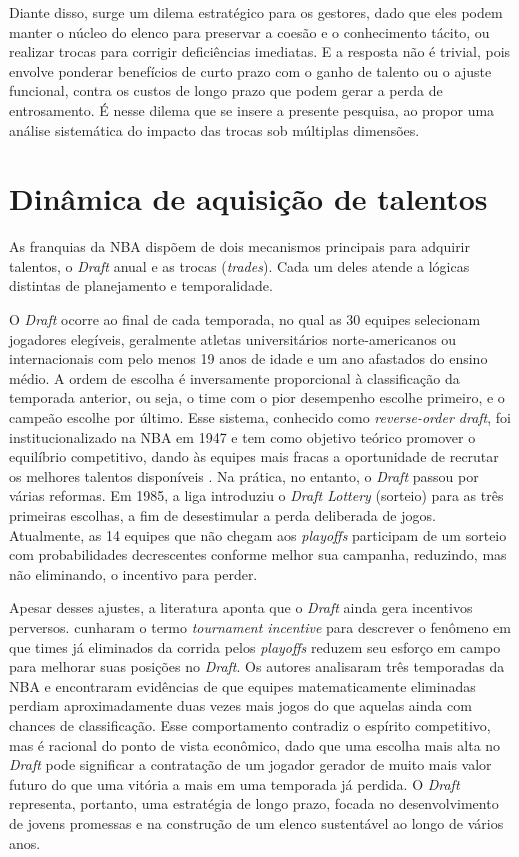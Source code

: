 Diante disso, surge um dilema estratégico para os gestores, dado que eles podem manter o núcleo do elenco para preservar a coesão e o conhecimento tácito, ou realizar trocas para corrigir deficiências imediatas. E a resposta não é trivial, pois envolve ponderar benefícios de curto prazo com o ganho de talento ou o ajuste funcional, contra os custos de longo prazo que podem gerar a perda de entrosamento. É nesse dilema que se insere a presente pesquisa, ao propor uma análise sistemática do impacto das trocas sob múltiplas dimensões.

\section{Dinâmica de aquisição de talentos}
\label{sec:talent_acquisition}

As franquias da NBA dispõem de dois mecanismos principais para adquirir talentos, o \textit{Draft} anual e as trocas (\textit{trades}). Cada um deles atende a lógicas distintas de planejamento e temporalidade.

O \textit{Draft} ocorre ao final de cada temporada, no qual as 30 equipes selecionam jogadores elegíveis, geralmente atletas universitários norte-americanos ou internacionais com pelo menos 19 anos de idade e um ano afastados do ensino médio. A ordem de escolha é inversamente proporcional à classificação da temporada anterior, ou seja, o time com o pior desempenho escolhe primeiro, e o campeão escolhe por último. Esse sistema, conhecido como \textit{reverse-order draft}, foi institucionalizado na NBA em 1947 e tem como objetivo teórico promover o equilíbrio competitivo, dando às equipes mais fracas a oportunidade de recrutar os melhores talentos disponíveis \citep{berri2011}. Na prática, no entanto, o \textit{Draft} passou por várias reformas. Em 1985, a liga introduziu o \textit{Draft Lottery} (sorteio) para as três primeiras escolhas, a fim de desestimular a perda deliberada de jogos. Atualmente, as 14 equipes que não chegam aos \textit{playoffs} participam de um sorteio com probabilidades decrescentes conforme melhor sua campanha, reduzindo, mas não eliminando, o incentivo para perder.

Apesar desses ajustes, a literatura aponta que o \textit{Draft} ainda gera incentivos perversos. \citet{taylor2002} cunharam o termo \textit{tournament incentive} para descrever o fenômeno em que times já eliminados da corrida pelos \textit{playoffs} reduzem seu esforço em campo para melhorar suas posições no \textit{Draft}. Os autores analisaram três temporadas da NBA e encontraram evidências de que equipes matematicamente eliminadas perdiam aproximadamente duas vezes mais jogos do que aquelas ainda com chances de classificação. Esse comportamento contradiz o espírito competitivo, mas é racional do ponto de vista econômico, dado que uma escolha mais alta no \textit{Draft} pode significar a contratação de um jogador gerador de muito mais valor futuro do que uma vitória a mais em uma temporada já perdida. O \textit{Draft} representa, portanto, uma estratégia de longo prazo, focada no desenvolvimento de jovens promessas e na construção de um elenco sustentável ao longo de vários anos.

